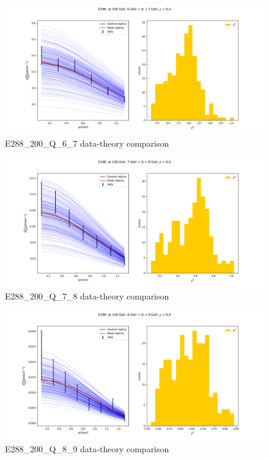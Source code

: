 \documentclass[
]{article}
\begin{document}
\begin{figure}
\centering
\includegraphics{pngplots/E288_200_Q_6_7.png}
\caption{E288\_200\_Q\_6\_7 data-theory comparison}
\end{figure}

\begin{figure}
\centering
\includegraphics{pngplots/E288_200_Q_7_8.png}
\caption{E288\_200\_Q\_7\_8 data-theory comparison}
\end{figure}

\begin{figure}
\centering
\includegraphics{pngplots/E288_200_Q_8_9.png}
\caption{E288\_200\_Q\_8\_9 data-theory comparison}
\end{figure}
\end{document}
